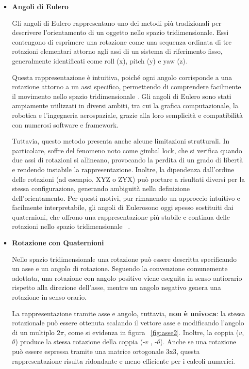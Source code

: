\begin{itemize}
    \item \textbf {Angoli di Eulero}
    
    Gli angoli di Eulero rappresentano uno dei metodi più tradizionali per descrivere l'orientamento di un oggetto nello spazio tridimensionale. Essi contengono di esprimere una rotazione come una sequenza ordinata di tre rotazioni elementari attorno agli assi di un sistema di riferimento fisso, generalmente identificati come roll (x), pitch (y) e yaw (z).
    
    Questa rappresentazione è intuitiva, poiché ogni angolo corrisponde a una rotazione attorno a un assi specifico, permettendo di comprendere facilmente il movimento nello spazio tridimensionale . Gli angoli di Eulero sono stati ampiamente utilizzati in diversi ambiti, tra cui la grafica computazionale, la robotica e l'ingegneria aerospaziale, grazie alla loro semplicità e compatibilità con numerosi software e framework.

    Tuttavia, questo metodo presenta anche alcune limitazioni strutturali. In particolare, soffre del fenomeno noto come gimbal lock, che si verifica quando due assi di rotazioni si allineano, provocando la perdita di un grado di libertà e rendendo instabile la rappresentazione. Inoltre, la dipendenza dall'ordine delle rotazioni (ad esempio, XYZ o ZYX) può portare a risultati diversi per la stessa configurazione, generando ambiguità nella definizione dell'orientamento.
    Per questi motivi, pur rimanendo un approccio intuitivo e facilmente interpretabile, gli angoli di Eulerosono oggi spesso sostituiti dai quaternioni, che offrono una rappresentazione più stabile e continua delle rotazioni nello spazio tridimensionale ~\cite{quater}.

    \item \textbf{Rotazione con Quaternioni}
    
    Nello spazio tridimensionale una rotazione può essere descritta specificando un asse e un angolo di rotazione. Seguendo la convenzione comunemente adottata, una rotazione con angolo positivo viene eseguita in senso antiorario rispetto alla direzione dell'asse, mentre un angolo negativo genera una rotazione in senso orario.

    La rappresentazione tramite asse e angolo, tuttavia, \textbf{non è univoca}: la stessa rotazionale può essere ottenuta scalando il vettore asse e modificando l'angolo di un multiplo 2${\pi}$, come si evidenza in figura ~\ref{fig:asse2}. Inoltre, la coppia (${v}$, ${\theta}$) produce la stessa rotazione della coppia (-${v}$ , -${\theta}$).
    Anche se una rotazione può essere espressa tramite una matrice ortogonale 3x3, questa rappresentazione risulta ridondante e meno efficiente per i calcoli numerici.


\end{itemize}
